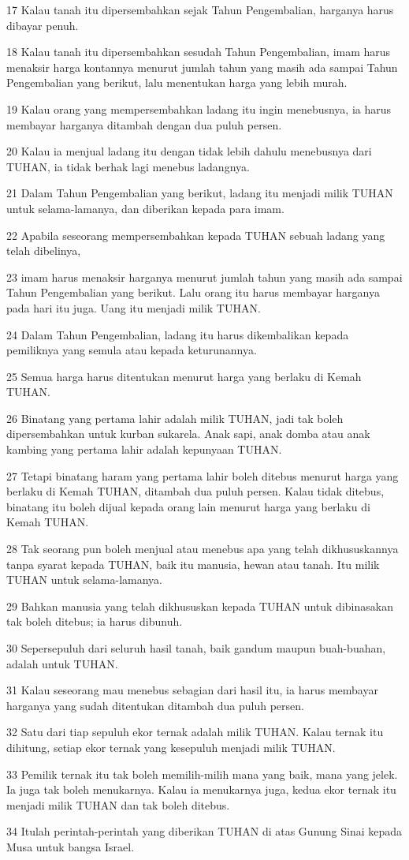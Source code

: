 \par 17 Kalau tanah itu dipersembahkan sejak Tahun Pengembalian, harganya harus dibayar penuh.
\par 18 Kalau tanah itu dipersembahkan sesudah Tahun Pengembalian, imam harus menaksir harga kontannya menurut jumlah tahun yang masih ada sampai Tahun Pengembalian yang berikut, lalu menentukan harga yang lebih murah.
\par 19 Kalau orang yang mempersembahkan ladang itu ingin menebusnya, ia harus membayar harganya ditambah dengan dua puluh persen.
\par 20 Kalau ia menjual ladang itu dengan tidak lebih dahulu menebusnya dari TUHAN, ia tidak berhak lagi menebus ladangnya.
\par 21 Dalam Tahun Pengembalian yang berikut, ladang itu menjadi milik TUHAN untuk selama-lamanya, dan diberikan kepada para imam.
\par 22 Apabila seseorang mempersembahkan kepada TUHAN sebuah ladang yang telah dibelinya,
\par 23 imam harus menaksir harganya menurut jumlah tahun yang masih ada sampai Tahun Pengembalian yang berikut. Lalu orang itu harus membayar harganya pada hari itu juga. Uang itu menjadi milik TUHAN.
\par 24 Dalam Tahun Pengembalian, ladang itu harus dikembalikan kepada pemiliknya yang semula atau kepada keturunannya.
\par 25 Semua harga harus ditentukan menurut harga yang berlaku di Kemah TUHAN.
\par 26 Binatang yang pertama lahir adalah milik TUHAN, jadi tak boleh dipersembahkan untuk kurban sukarela. Anak sapi, anak domba atau anak kambing yang pertama lahir adalah kepunyaan TUHAN.
\par 27 Tetapi binatang haram yang pertama lahir boleh ditebus menurut harga yang berlaku di Kemah TUHAN, ditambah dua puluh persen. Kalau tidak ditebus, binatang itu boleh dijual kepada orang lain menurut harga yang berlaku di Kemah TUHAN.
\par 28 Tak seorang pun boleh menjual atau menebus apa yang telah dikhususkannya tanpa syarat kepada TUHAN, baik itu manusia, hewan atau tanah. Itu milik TUHAN untuk selama-lamanya.
\par 29 Bahkan manusia yang telah dikhususkan kepada TUHAN untuk dibinasakan tak boleh ditebus; ia harus dibunuh.
\par 30 Sepersepuluh dari seluruh hasil tanah, baik gandum maupun buah-buahan, adalah untuk TUHAN.
\par 31 Kalau seseorang mau menebus sebagian dari hasil itu, ia harus membayar harganya yang sudah ditentukan ditambah dua puluh persen.
\par 32 Satu dari tiap sepuluh ekor ternak adalah milik TUHAN. Kalau ternak itu dihitung, setiap ekor ternak yang kesepuluh menjadi milik TUHAN.
\par 33 Pemilik ternak itu tak boleh memilih-milih mana yang baik, mana yang jelek. Ia juga tak boleh menukarnya. Kalau ia menukarnya juga, kedua ekor ternak itu menjadi milik TUHAN dan tak boleh ditebus.
\par 34 Itulah perintah-perintah yang diberikan TUHAN di atas Gunung Sinai kepada Musa untuk bangsa Israel.


